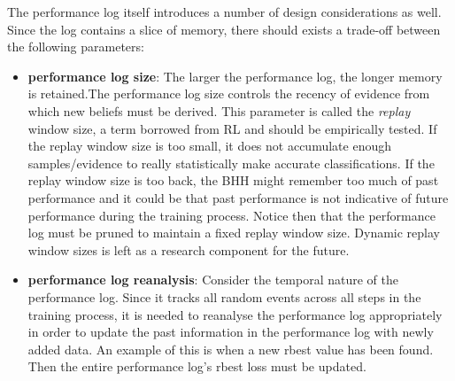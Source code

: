\begin{table}[htbp]
	\centering
	\caption{Performance log example showing the first 5 entity's selected heuristics for step 1 and their resulting performance measurements.}
	\label{tab:bhh:performance_log:performance_log_example}%
	\par\bigskip
\end{table}%

The performance log itself introduces a number of design considerations as well. Since the log contains a slice of memory, there should exists a trade-off between the following parameters:

\begin{itemize}
    \item \textbf{performance log size}: The larger the performance log, the longer memory is retained.The performance log size controls the recency of evidence from which new beliefs must be derived. This parameter is called the \textit{replay} window size, a term borrowed from \ac{RL} and should be empirically tested. If the replay window size is too small, it does not accumulate enough samples/evidence to really statistically make accurate classifications. If the replay window size is too back, the \ac{BHH} might remember too much of past performance and it could be that past performance is not indicative of future performance during the training process. Notice then that the performance log must be pruned to maintain a fixed replay window size. Dynamic replay window sizes is left as a research component for the future.
    
    \item \textbf{performance log reanalysis}: Consider the temporal nature of the performance log. Since it tracks all random events across all steps in the training process, it is needed to reanalyse the performance log appropriately in order to update the past information in the performance log with newly added data. An example of this is when a new rbest value has been found. Then the entire performance log's rbest loss must be updated.
\end{itemize}


